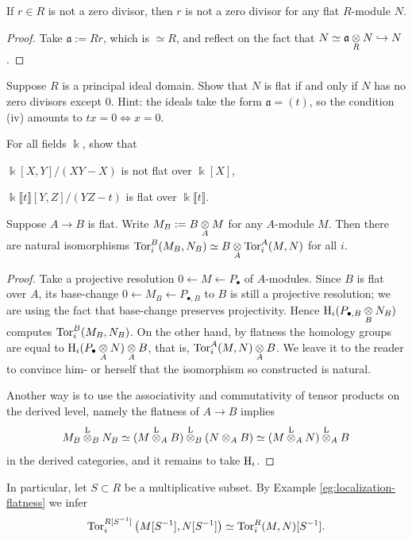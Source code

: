 \begin{corollary}
	If $r \in R$ is not a zero divisor, then $r$ is not a zero divisor for any flat $R$-module $N$.
\end{corollary}
\begin{proof}
	Take $\mathfrak{a} :=Rr$, which is $\simeq R$, and reflect on the fact that $N \simeq \mathfrak{a} \underset{R}{\otimes} N \hookrightarrow N$.
\end{proof}

\begin{exercise}
	Suppose $R$ is a principal ideal domain. Show that $N$ is flat if and only if $N$ has no zero divisors except $0$. Hint: the ideals take the form $\mathfrak{a} = (t)$, so the condition (iv) amounts to $tx=0 \iff x=0$.
\end{exercise}

\begin{exercise}
	For all fields $\Bbbk$, show that
	\begin{compactenum}[(i)]
		\item $\Bbbk[X,Y]/(XY-X)$ is not flat over $\Bbbk[X]$,
		\item $\Bbbk\llbracket t \rrbracket[Y,Z]/(YZ-t)$ is flat over $\Bbbk\llbracket t\rrbracket$.
	\end{compactenum}
\end{exercise}

\begin{lemma}
	Suppose $A \to B$ is flat. Write $M_B := B \underset{A}{\otimes} M$ for any $A$-module $M$. Then there are natural isomorphisms $\operatorname{Tor}_i^B(M_B, N_B) \simeq B \underset{A}{\otimes} \operatorname{Tor}_i^A(M,N)$ for all $i$.
\end{lemma}
\begin{proof}
	Take a projective resolution $0 \leftarrow M \leftarrow P_\bullet$ of $A$-modules. Since $B$ is flat over $A$, its base-change $0 \leftarrow M_B \leftarrow P_{\bullet,B}$ to $B$ is still a projective resolution; we are using the fact that base-change preserves projectivity. Hence $\operatorname{H}_i(P_{\bullet,B} \underset{B}{\otimes} N_B)$ computes $\operatorname{Tor}_i^B(M_B, N_B)$. On the other hand, by flatness the homology groups are equal to $\operatorname{H}_i(P_\bullet \underset{A}{\otimes} N) \underset{A}{\otimes} B$, that is, $\operatorname{Tor}_i^A(M,N) \underset{A}{\otimes} B$. We leave it to the reader to convince him- or herself that the isomorphism so constructed is natural.
	
	Another way is to use the associativity and commutativity of tensor products on the derived level, namely the flatness of $A \to B$ implies
	\[ M_B \overset{\mathrm{L}}{\otimes}_B N_B \simeq (M \overset{\mathrm{L}}{\otimes}_A B) \overset{\mathrm{L}}{\otimes}_B (N \otimes_A B) \simeq (M \overset{\mathrm{L}}{\otimes}_A N) \overset{\mathrm{L}}{\otimes}_A B \]
	in the derived categories, and it remains to take $\operatorname{H}_i$.
\end{proof}
In particular, let $S \subset R$ be a multiplicative subset. By Example \ref{eg:localization-flatness} we infer
\[ \operatorname{Tor}_i^{R[S^{-1}]}\left( M[S^{-1}], N[S^{-1}] \right) \simeq \operatorname{Tor}_i^R(M,N)[S^{-1}]. \]

